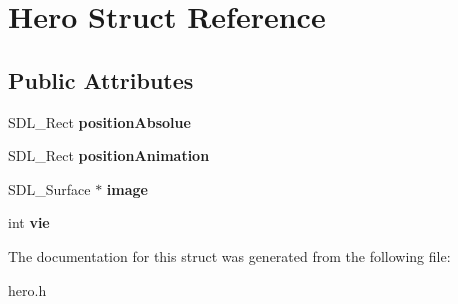 \hypertarget{structHero}{}\section{Hero Struct Reference}
\label{structHero}
\subsection*{Public Attributes}
\begin{DoxyCompactItemize}
\item 
\mbox{\label{structHero_aa174bc07ff82afb25c521fc15a61f185}} 
S\+D\+L\+\_\+\+Rect {\bfseries position\+Absolue}
\item 
\mbox{\label{structHero_ab1c032e99b2742176acc883789ee4b91}} 
S\+D\+L\+\_\+\+Rect {\bfseries position\+Animation}
\item 
\mbox{\label{structHero_a3770973cf39e7634c1d98327508ca4e6}} 
S\+D\+L\+\_\+\+Surface $\ast$ {\bfseries image}
\item 
\mbox{\label{structHero_a9c630540786c982a47e0837550cf6405}} 
int {\bfseries vie}
\end{DoxyCompactItemize}


The documentation for this struct was generated from the following file\+:\begin{DoxyCompactItemize}
\item 
hero.\+h\end{DoxyCompactItemize}
